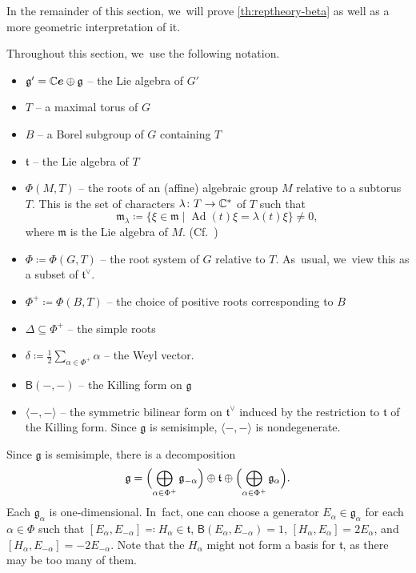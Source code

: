 \documentclass[11pt]{article}
\newcommand{\bme}{{\boldsymbol{e}}}
\begin{document}
In the remainder of this section, we~will prove \cref{th:reptheory-beta} as well as a more geometric interpretation of it.

\begin{notation}
Throughout this section, we~use the following notation.

\begin{itemize}
\item $\mathfrak{g}'=\C\bme\oplus \mathfrak{g}$ -- the Lie algebra of $G'$
\item $T$ -- a maximal torus of $G$
\item $B$ -- a Borel subgroup of $G$ containing $T$
\item $\mathfrak{t}$ -- the Lie algebra of $T$

\item $\Phi(M,T)$ -- the roots of an (affine) algebraic group $M$ relative to a subtorus $T$. This is the set of characters $\lambda\colon T\to {\mathbb C}^*$ of $T$ such that
\[
\mathfrak{m}_\lambda \coloneqq \{\xi\in \mathfrak{m} \mid \operatorname{Ad}(t)\xi = \lambda(t)\xi\}\neq 0,
\]
where $\mathfrak{m}$ is the Lie algebra of $M$. (Cf.~\cite{Hum75})

\item $\Phi\coloneqq \Phi(G,T)$ -- the root system of $G$ relative to $T$. As~usual, we~view this as a subset of $\mathfrak{t}^\vee$.

\item $\Phi^+\coloneqq \Phi(B,T)$ -- the choice of positive roots corresponding to $B$

\item $\Delta\subseteq \Phi^+$ -- the simple roots

\item $\delta \coloneqq \displaystyle\frac{1}{2}\sum_{\alpha\in \Phi^+}\alpha$ -- the Weyl vector.

\item $\mathsf{B}(-,-)$ -- the Killing form on $\mathfrak{g}$
\item $\langle-,-\rangle$ -- the symmetric bilinear form on $\mathfrak{t}^\vee$ induced by the restriction to $\mathfrak{t}$ of the Killing form. Since $\mathfrak{g}$ is semisimple, $\langle-,-\rangle$ is nondegenerate.
\qedhere
\end{itemize}
\end{notation}

Since $\mathfrak{g}$ is semisimple, there is a decomposition
\[
\mathfrak{g} = \Bigl(\bigoplus_{\alpha\in \Phi^+} \mathfrak{g}_{-\alpha}\Bigr)\oplus \mathfrak{t}\oplus \Bigl(\bigoplus_{\alpha\in \Phi^+} \mathfrak{g}_\alpha\Bigr).
\]
Each $\mathfrak{g}_\alpha$ is one-dimensional. In~fact, one can choose a generator $E_\alpha\in \mathfrak{g}_\alpha$ for each $\alpha\in \Phi$ such that $[E_\alpha,E_{-\alpha}]\eqqcolon H_\alpha\in \mathfrak{t}$, $\mathsf{B}(E_\alpha, E_{-\alpha})=1$, $[H_\alpha, E_\alpha]=2E_\alpha$, and $[H_\alpha, E_{-\alpha}]=-2E_{-\alpha}$. Note that the $H_\alpha$ might not form a basis for $\mathfrak{t}$, as there may be too many of them.
\end{document}
